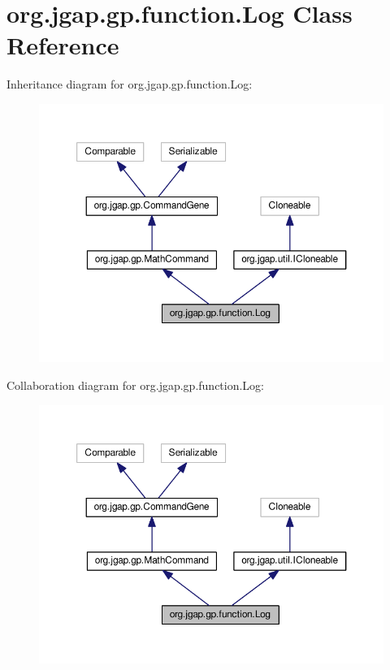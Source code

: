 \hypertarget{classorg_1_1jgap_1_1gp_1_1function_1_1_log}{\section{org.\-jgap.\-gp.\-function.\-Log Class Reference}
\label{classorg_1_1jgap_1_1gp_1_1function_1_1_log}
}


Inheritance diagram for org.\-jgap.\-gp.\-function.\-Log\-:
\nopagebreak
\begin{figure}[H]
\begin{center}
\leavevmode
\includegraphics[width=350pt]{classorg_1_1jgap_1_1gp_1_1function_1_1_log__inherit__graph}
\end{center}
\end{figure}


Collaboration diagram for org.\-jgap.\-gp.\-function.\-Log\-:
\nopagebreak
\begin{figure}[H]
\begin{center}
\leavevmode
\includegraphics[width=350pt]{classorg_1_1jgap_1_1gp_1_1function_1_1_log__coll__graph}
\end{center}
\end{figure}
